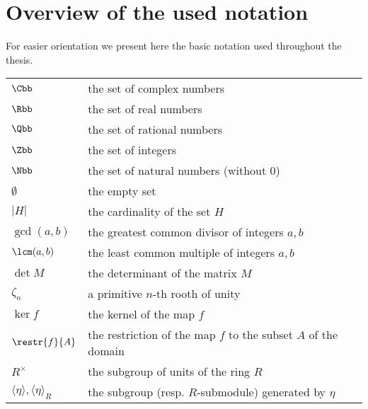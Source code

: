 \chapter*{Overview of the used notation}
For easier orientation we present here the basic notation used throughout the thesis.
\begin{longtable}[l]{ll} %
  $\Cbb$                 & the set of complex numbers \\[1mm]
  $\Rbb$                 & the set of real numbers \\[1mm]
  $\Qbb$                 & the set of rational numbers \\[1mm]
  $\Zbb$                 & the set of integers \\[1mm]
  $\Nbb$                 & the set of natural numbers (without $0$)\\[1mm]
  $\emptyset$                 & the empty set\\[1mm]
  $|H|$						& the cardinality of the set $H$  \\[1mm]
  $\gcd(a,b)$			& the greatest common divisor of integers $a,b$ \\[1mm]
  $\lcm(a,b)$			& the least common multiple of integers $a,b$ \\[1mm]
  $\det M$			& the determinant of the matrix $M$ \\[1mm]
  $\zeta_n$                 & a primitive $n$-th rooth of unity \\[1mm] %
  $\ker f$                 & the kernel of the map $f$ \\[1mm]
  $\restr{f}{A}$		& the restriction of the map $f$ to the subset $A$ of the domain \\[1mm]
  $R^{\times}$		& the subgroup of units of the ring $R$ \\[1mm]
  $\langle \eta \rangle, \langle \eta \rangle_{R}$ & the subgroup (resp. $R$-submodule) generated by $\eta$ \\[1mm]

\end{longtable}
